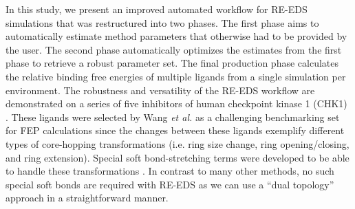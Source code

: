 In this study, we present an improved automated workflow for RE-EDS simulations that was restructured into two phases. The first phase aims to automatically estimate method parameters that otherwise had to be provided by the user. The second phase automatically optimizes the estimates from the first phase to retrieve a robust parameter set. The final production phase calculates the relative binding free energies of multiple ligands from a single simulation per environment. 
The robustness and versatility of the RE-EDS workflow are demonstrated on a series of five inhibitors of human checkpoint kinase 1 (CHK1) \cite{Huang2012}.
These ligands were selected by Wang \textit{et al.} \cite{Wang2017} as a challenging benchmarking set for FEP calculations since the changes between these ligands exemplify different types of core-hopping transformations (i.e. ring size change, ring opening/closing, and ring extension). Special soft bond-stretching terms were developed to be able to handle these transformations \cite{Wang2017}. In contrast to many other methods, no such special soft bonds are required with RE-EDS as we can use a ``dual topology'' approach \cite{Riniker2011} in a straightforward manner. 